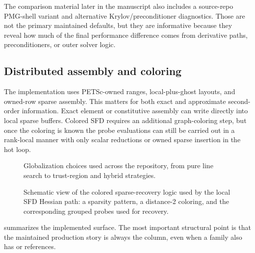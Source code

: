 The comparison material later in the manuscript also includes a source-repo
PMG-shell variant and alternative Krylov/preconditioner diagnostics. Those are
not the primary maintained defaults, but they are informative because they
reveal how much of the final performance difference comes from derivative
paths, preconditioners, or outer solver logic.

\subsection{Distributed assembly and coloring}

The \jaxpetsc{} implementation uses PETSc-owned ranges, local-plus-ghost
layouts, and owned-row sparse assembly. This matters for both exact and
approximate second-order information. Exact element or constitutive assembly can
write directly into local sparse buffers. Colored SFD requires an additional
graph-coloring step, but once the coloring is known the probe evaluations can
still be carried out in a rank-local manner with only scalar reductions or
owned sparse insertion in the hot loop.

\begin{figure}[H]
  \centering
  \PaperGlobalizationDiagram
  \caption{Globalization choices used across the repository, from pure line
  search to trust-region and hybrid strategies.}
  \label{fig:globalization}
\end{figure}

\begin{figure}[H]
  \centering
  \PaperColoringDiagram
  \caption{Schematic view of the colored sparse-recovery logic used by the
  local SFD Hessian path: a sparsity pattern, a distance-2 coloring, and the
  corresponding grouped probes used for recovery.}
  \label{fig:globalization-coloring}
\end{figure}

\begin{table}[H]
  \centering
  
  \caption{Implementation capability matrix across the maintained benchmark
  families. ``Higher-order / advanced AD'' summarizes the derivative choices
  that are scientifically interesting in each family.}
  \label{tab:capability-matrix}
\end{table}

 summarizes the implemented surface. The most
important structural point is that the maintained production story is always
the \jaxpetsc{} column, even when a family also has \fenics{} or \purejax{}
references.

